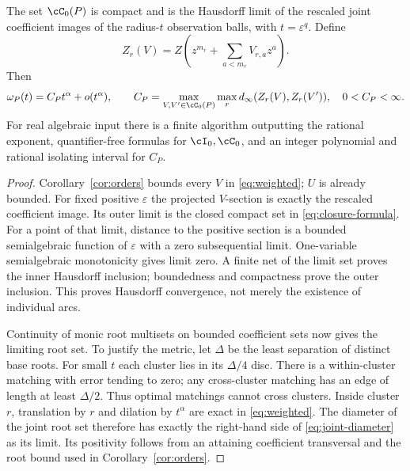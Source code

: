 \begin{theorem}\label{thm:joint}
The set $\cC_0(P)$ is compact and is the Hausdorff limit of the rescaled
joint coefficient images of the radius-$t$ observation balls, with
$t=\varepsilon^q$. Define
\[
 Z_r(V)=Z\left(z^{m_r}+\sum_{a<m_r}V_{r,a}z^a\right).
\]
Then
\begin{equation}\label{eq:joint-diameter}
 \omega_P(t)=C_Pt^\alpha+o(t^\alpha),\qquad
 C_P=\max_{V,V'\in\cC_0(P)}\max_r d_\infty(Z_r(V),Z_r(V')),
 \quad 0<C_P<\infty.
\end{equation}
For real algebraic input there is a finite algorithm outputting the
rational exponent, quantifier-free formulas for $\cI_0,\cC_0$, and an
integer polynomial and rational isolating interval for $C_P$.
\end{theorem}
\begin{proof}
Corollary~\ref{cor:orders} bounds every $V$ in \eqref{eq:weighted};
$U$ is already bounded. For fixed positive $\varepsilon$ the projected
$V$-section is exactly the rescaled coefficient image. Its outer limit
is the closed compact set in \eqref{eq:closure-formula}. For a point
of that limit, distance to the positive section is a bounded
semialgebraic function of $\varepsilon$ with a zero subsequential
limit. One-variable semialgebraic monotonicity gives limit zero.
A finite net of the limit set proves the inner Hausdorff inclusion;
boundedness and compactness prove the outer inclusion. This proves
Hausdorff convergence, not merely the existence of individual arcs.

Continuity of monic root multisets on bounded coefficient sets now
gives the limiting root set. To justify the metric, let $\Delta$ be the
least separation of distinct base roots. For small $t$ each cluster
lies in its $\Delta/4$ disc. There is a within-cluster matching with
error tending to zero; any cross-cluster matching has an edge of length
at least $\Delta/2$. Thus optimal matchings cannot cross clusters.
Inside cluster $r$, translation by $r$ and dilation by $t^\alpha$
are exact in \eqref{eq:weighted}. The diameter of the joint root set
therefore has exactly the right-hand side of \eqref{eq:joint-diameter}
as its limit. Its positivity follows from an attaining coefficient
transversal and the root bound used in Corollary~\ref{cor:orders}.


\end{proof}
